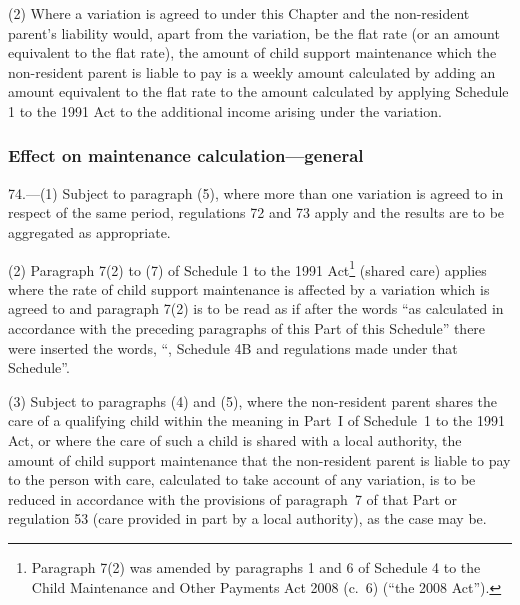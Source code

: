 \documentclass[12pt,a4paper]{article}
\begin{document}
(2) Where a variation is agreed to under this Chapter and the non-resident parent’s liability would, apart from the variation, be the flat rate (or an amount equivalent to the flat rate), the amount of child support maintenance which the non-resident parent is liable to pay is a weekly amount calculated by adding an amount equivalent to the flat rate to the amount calculated by applying Schedule 1 to the 1991 Act to the additional income arising under the variation.

\subsubsection[74. Effect on maintenance calculation---general]{Effect on maintenance calculation---general}

74.---(1)  Subject to paragraph (5), where more than one variation is agreed to in respect of the same period, regulations 72 and 73 apply and the results are to be aggregated as appropriate.


(2) Paragraph 7(2) to (7) of Schedule 1 to the 1991 Act\footnote{Paragraph 7(2) was amended by paragraphs 1 and 6 of Schedule 4 to the Child Maintenance and Other Payments Act 2008 (c.~6) (“the 2008 Act”).} (shared care) applies where the rate of child support maintenance is affected by a variation which is agreed to and paragraph 7(2) is to be read as if after the words “as calculated in accordance with the preceding paragraphs of this Part of this Schedule” there were inserted the words, “, Schedule 4B and regulations made under that Schedule”.

(3) Subject to paragraphs (4) and (5), where the non-resident parent shares the care of a qualifying child within the meaning in Part~I of Schedule~1 to the 1991 Act, or where the care of such a child is shared with a local authority, the amount of child support maintenance that the non-resident parent is liable to pay to the person with care, calculated to take account of any variation, is to be reduced in accordance with the provisions of paragraph~7 of that Part or regulation 53 (care provided in part by a local authority), as the case may be.
\end{document}
